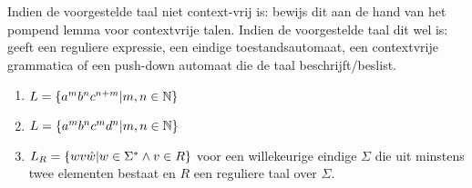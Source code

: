 \documentclass{article}
\begin{document}
\begin{question}
Indien de voorgestelde taal niet context-vrij is: bewijs dit aan de hand van het pompend lemma voor contextvrije talen.
Indien de voorgestelde taal dit wel is: geeft een reguliere expressie, een eindige toestandsautomaat, een contextvrije
grammatica of een push-down automaat die de taal beschrijft/beslist.
\begin{enumerate}
 \item $L=\left\{ a^mb^nc^{n+m}|m,n\in\mathbb{N} \right\}$
 \item $L=\left\{ a^mb^nc^md^n|m,n\in\mathbb{N} \right\}$
 \item $L_R=\left\{ wv\hat{w}|w\in\Sigma^*\wedge v\in R \right\}$ voor een willekeurige eindige $\Sigma$ die uit minstens twee
elementen bestaat en $R$ een reguliere taal over $\Sigma$.
\end{enumerate}
\end{question}
\end{document}
